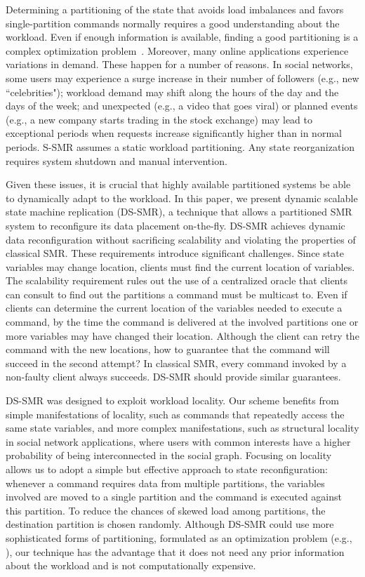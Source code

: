 Determining a partitioning of the state that avoids load imbalances and favors single-partition commands normally requires a good understanding about the workload. 
Even if enough information is available, finding a good partitioning is a complex optimization problem~\cite{curino2010sch,taft2014est}.
Moreover, many online applications experience variations in demand. 
These happen for a number of reasons. 
In social networks, some users may experience a surge increase in their number of followers (e.g., new ``celebrities");
workload demand may shift along the hours of the day and the days of the week; and unexpected (e.g., a video that goes viral) or planned events (e.g., a new company starts trading in the stock exchange) may lead to exceptional periods when requests increase significantly higher than in normal periods.
S-SMR assumes a static workload partitioning.
Any state reorganization requires system shutdown and manual intervention.

Given these issues, it is crucial that highly available partitioned systems be able to dynamically adapt to the workload.
In this paper, we present dynamic scalable state machine replication (DS-SMR), a technique that allows a partitioned SMR system to reconfigure its data placement on-the-fly.
DS-SMR achieves dynamic data reconfiguration without sacrificing scalability and violating the properties of classical SMR.
These requirements introduce significant challenges.
Since state variables may change location, clients must find the current location of variables.
The scalability requirement rules out the use of a centralized oracle that clients can consult to find out the partitions a command must be multicast to.
Even if clients can determine the current location of the variables needed to execute a command, by the time the command is delivered at the involved partitions one or more variables may have changed their location.
Although the client can retry the command with the new locations, how to guarantee that the command will succeed in the second attempt?
In classical SMR, every command invoked by a non-faulty client always succeeds.
DS-SMR should provide similar guarantees.

DS-SMR was designed to exploit workload locality.
Our scheme benefits from simple manifestations of locality, such as commands that repeatedly access the same state variables, and more complex manifestations, such as structural locality in social network applications, where users with common interests have a higher probability of being interconnected in the social graph.
Focusing on locality allows us to adopt a simple but effective approach to state reconfiguration: whenever a command requires data from multiple partitions, the variables involved are moved to a single partition and the command is executed against this partition.
To reduce the chances of skewed load among partitions, the destination partition is chosen randomly.
Although DS-SMR could use more sophisticated forms of partitioning, formulated as an optimization problem (e.g., \cite{curino2010sch,taft2014est}), our technique has the advantage that it does not need any prior information about the workload and is not computationally expensive.

